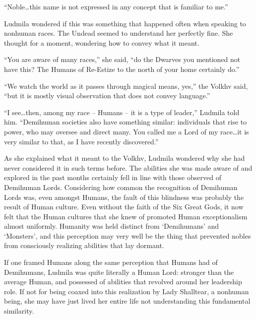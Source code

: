  

“Noble…this name is not expressed in any concept that is familiar to me.”

 

Ludmila wondered if this was something that happened often when speaking to nonhuman races. The Undead seemed to understand her perfectly fine. She thought for a moment, wondering how to convey what it meant.

 

“You are aware of many races,” she said, “do the Dwarves you mentioned not have this? The Humans of Re-Estize to the north of your home certainly do.”

 

“We watch the world as it passes through magical means, yes,” the Volkhv said, “but it is mostly visual observation that does not convey language.”

 

“I see…then, among my race – Humans – it is a type of leader,” Ludmila told him. “Demihuman societies also have something similar: individuals that rise to power, who may oversee and direct many. You called me a Lord of my race…it is very similar to that, as I have recently discovered.”

 

As she explained what it meant to the Volkhv, Ludmila wondered why she had never considered it in such terms before. The abilities she was made aware of and explored in the past months certainly fell in line with those observed of Demihuman Lords. Considering how common the recognition of Demihuman Lords was, even amongst Humans, the fault of this blindness was probably the result of Human culture. Even without the faith of the Six Great Gods, it now felt that the Human cultures that she knew of promoted Human exceptionalism almost uniformly. Humanity was held distinct from ‘Demihumans’ and ‘Monsters’, and this perception may very well be the thing that prevented nobles from consciously realizing abilities that lay dormant.

 

If one framed Humans along the same perception that Humans had of Demihumans, Ludmila was quite literally a Human Lord: stronger than the average Human, and possessed of abilities that revolved around her leadership role. If not for being coaxed into this realization by Lady Shalltear, a nonhuman being, she may have just lived her entire life not understanding this fundamental similarity.

 

